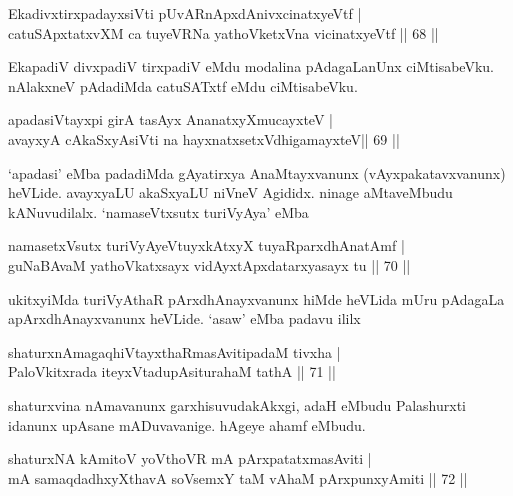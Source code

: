 \begin{shl}
EkadivxtirxpadayxsiVti pUvARnApxdAnivxcinatxyeVtf  | \\
catuSApxtatxvXM ca tuyeVRNa yathoVketxVna vicinatxyeVtf \hfill||  68 || 
\end{shl}

\begin{artha} 
EkapadiV divxpadiV tirxpadiV eMdu modalina pAdagaLanUnx ciMtisabeVku. 
nAlakxneV pAdadiMda catuSATxtf eMdu ciMtisabeVku.
\end{artha}

\begin{shl}
apadasiVtayxpi girA tasAyx AnanatxyXmucayxteV  | \\
avayxyA cAkaSxyA\s siVti na hayxnatxsetxV\s dhigamayxteV\hfill ||  69 || 
\end{shl}

\begin{artha} 
`apadasi' eMba padadiMda gAyatirxya AnaMtayxvanunx 
(vAyxpakatavxvanunx) heVLide. avayxyaLU akaSxyaLU niVneV Agididx. 
ninage aMtaveMbudu kANuvudilalx. `namaseVtx\s sutx turiVyAya' eMba 
\end{artha}

\begin{shl}
namasetxV\s sutx turiVyAyeVtuyxkAtxyX tuyaRparxdhAnatAmf | \\
guNaBAvaM yathoVkatxsayx vidAyxtApxdatarxyasayx tu \hfill||  70 || 
\end{shl}

\begin{artha} 
ukitxyiMda turiVyAthaR pArxdhAnayxvanunx hiMde heVLida mUru pAdagaLa 
apArxdhAnayxvanunx heVLide. `asaw' eMba padavu ililx
\end{artha}

\begin{shl}
shaturxnAmagaqhiVtayxthaRmasAvitipadaM tivxha | \\
PaloVkitxrada iteyxVtadupAsiturahaM tathA \hfill||  71 || 
\end{shl}

\begin{artha} 
shaturxvina nAmavanunx garxhisuvudakAkxgi, adaH eMbudu Palashurxti 
idanunx upAsane mADuvavanige. hAgeye ahamf eMbudu.
\end{artha}


\begin{shl}
shaturxNA kAmitoV yoV\s thoVR mA pArxpatatxmasAviti | \\
mA samaqdadhxyXthavA soV\s semxY taM vA\s haM pArxpunxyAmiti \hfill||  72 || 
\end{shl}


